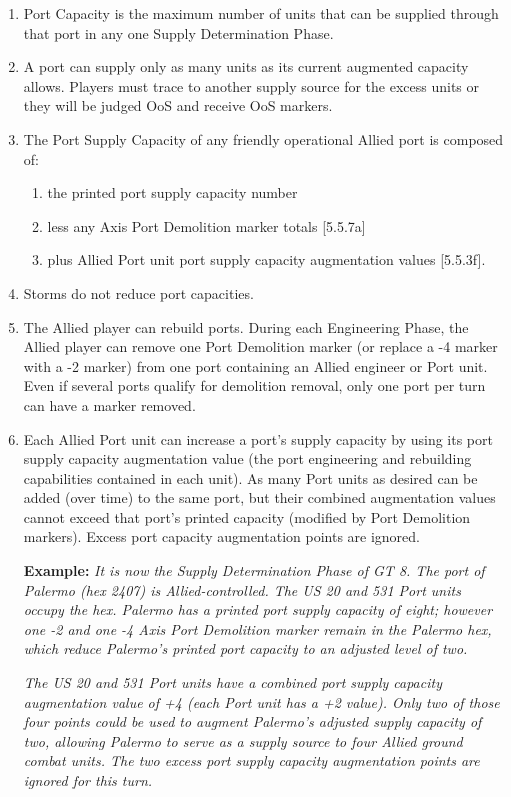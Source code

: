 \begin{enumerate}[label=\alph*.]
    \item Port Capacity is the maximum number of units that can be supplied through that port in any one Supply Determination Phase.
    \item A port can supply only as many units as its current augmented capacity allows. Players must trace to another supply source for the excess units or they will be judged OoS and receive OoS markers.
    \item The Port Supply Capacity of any friendly operational Allied port is composed of:
    \begin{enumerate}[label=\arabic*.]
        \item the printed port supply capacity number
        \item less any Axis Port Demolition marker totals [5.5.7a]
        \item plus Allied Port unit port supply capacity augmentation values [5.5.3f].
    \end{enumerate}
    \item Storms do not reduce port capacities.
    \item The Allied player can rebuild ports. During each Engineering Phase, the Allied player can remove one Port Demolition marker (or replace a -4 marker with a -2 marker) from one port containing an Allied engineer or Port unit. Even if several ports qualify for demolition removal, only one port per turn can have a marker removed.
    \item Each Allied Port unit can increase a port's supply capacity by using its port supply capacity augmentation value (the port engineering and rebuilding capabilities contained in each unit). As many Port units as desired can be added (over time) to the same port, but their combined augmentation values cannot exceed that port's printed capacity (modified by Port Demolition markers). Excess port capacity augmentation points are ignored.
    
    \textbf{Example:} \textit{It is now the Supply Determination Phase of GT 8. The port of Palermo (hex 2407) is Allied-controlled. The US 20 and 531 Port units occupy the hex. Palermo has a printed port supply capacity of eight; however one -2 and one -4 Axis Port Demolition marker remain in the Palermo hex, which reduce Palermo's printed port capacity to an adjusted level of two.}
    
    \textit{The US 20 and 531 Port units have a combined port supply capacity augmentation value of +4 (each Port unit has a +2 value). Only two of those four points could be used to augment Palermo's adjusted supply capacity of two, allowing Palermo to serve as a supply source to four Allied ground combat units. The two excess port supply capacity augmentation points are ignored for this turn.}
    

\end{enumerate}
